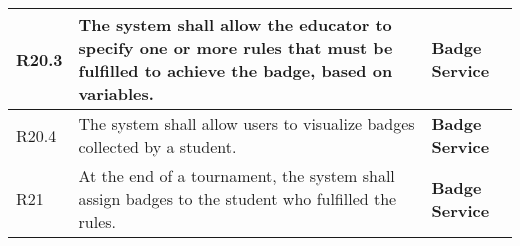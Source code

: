 \begin{center}
\begin{longtable}{|l|p{8cm}|p{5cm}|}
        R20.3 & The system shall allow the educator to specify one or more rules that must be fulfilled to achieve the badge, based on variables.                                              & \textbf{Badge Service}                                                     \\\hline
        R20.4 & The system shall allow users to visualize badges collected by a student.                                                                                                       & \textbf{Badge Service}                                                     \\\hline
        R21   & At the end of a tournament, the system shall assign badges to the student who fulfilled the rules.                                                                             & \textbf{Badge Service}                                                     \\\hline
    \end{longtable}
\end{center}
